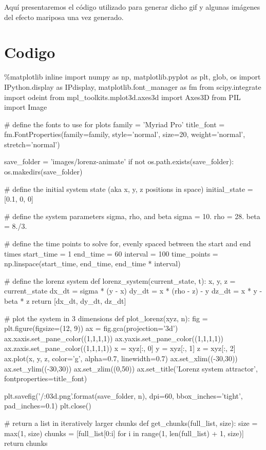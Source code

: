 \documentclass[a4paper,12pt]{article}
\begin{document}
Aquí presentaremos el código utilizado para generar dicho gif y algunas imágenes del efecto mariposa una vez generado.

\section*{Codigo}
\%matplotlib inline
import numpy as np, matplotlib.pyplot as plt, glob, os
import IPython.display as IPdisplay, matplotlib.font\_manager as fm
from scipy.integrate import odeint
from mpl\_toolkits.mplot3d.axes3d import Axes3D
from PIL import Image

\# define the fonts to use for plots
family = 'Myriad Pro'
title\_font = fm.FontProperties(family=family, style='normal', size=20, weight='normal', stretch='normal')

save\_folder = 'images/lorenz-animate'
if not os.path.exists(save\_folder):
    os.makedirs(save\_folder)
    
    \# define the initial system state (aka x, y, z positions in space)
initial\_state = [0.1, 0, 0]

\# define the system parameters sigma, rho, and beta
sigma = 10.
rho   = 28.
beta  = 8./3.

\# define the time points to solve for, evenly spaced between the start and end times
start\_time = 1
end\_time = 60
interval = 100
time\_points = np.linspace(start\_time, end\_time, end\_time * interval)

\# define the lorenz system
def lorenz\_system(current\_state, t):
    x, y, z = current\_state
    dx\_dt = sigma * (y - x)
    dy\_dt = x * (rho - z) - y
    dz\_dt = x * y - beta * z
    return [dx\_dt, dy\_dt, dz\_dt]
    
    \# plot the system in 3 dimensions
def plot\_lorenz(xyz, n):
    fig = plt.figure(figsize=(12, 9))
    ax = fig.gca(projection='3d')
    ax.xaxis.set\_pane\_color((1,1,1,1))
    ax.yaxis.set\_pane\_color((1,1,1,1))
    ax.zaxis.set\_pane\_color((1,1,1,1))
    x = xyz[:, 0]
    y = xyz[:, 1]
    z = xyz[:, 2]
    ax.plot(x, y, z, color='g', alpha=0.7, linewidth=0.7)
    ax.set\_xlim((-30,30))
    ax.set\_ylim((-30,30))
    ax.set\_zlim((0,50))
    ax.set\_title('Lorenz system attractor', fontproperties=title\_font)
    
    plt.savefig('{}/{:03d}.png'.format(save\_folder, n), dpi=60, bbox\_inches='tight', pad\_inches=0.1)
    plt.close()
    
    \# return a list in iteratively larger chunks
def get\_chunks(full\_list, size):
    size = max(1, size)
    chunks = [full\_list[0:i] for i in range(1, len(full\_list) + 1, size)]
    return chunks
    
\end{document}
